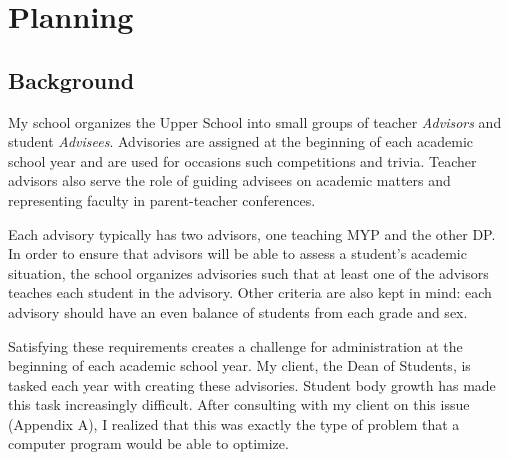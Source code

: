 \documentclass[advisory-ia.tex]{subfiles}
\begin{document}
  \section{Planning}
  \label{sec:planning}
  \subsection{Background}
  My school organizes the Upper School into small groups of teacher \emph{Advisors} and student \emph{Advisees}.
  Advisories are assigned at the beginning of each academic school year and are used for occasions such competitions and trivia.
  Teacher advisors also serve the role of guiding advisees on academic matters and representing faculty in parent-teacher conferences.

  Each advisory typically has two advisors, one teaching MYP and the other DP.
  In order to ensure that advisors will be able to assess a student's academic situation, the school organizes advisories such that at least one of the advisors teaches each student in the advisory.
  Other criteria are also kept in mind: each advisory should have an even balance of students from each grade and sex.

  Satisfying these requirements creates a challenge for administration at the beginning of each academic school year.
  My client, the Dean of Students, is tasked each year with creating these advisories.
  Student body growth has made this task increasingly difficult.
  After consulting with my client on this issue (Appendix A), I realized that this was exactly the type of problem that a computer program would be able to optimize.
\end{document}
